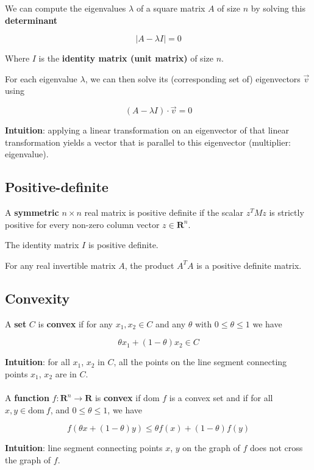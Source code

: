 \documentclass{article}
\begin{document}
We can compute the eigenvalues $\lambda$ of a square matrix $A$ of size $n$ by solving this \textbf{determinant}

$$
|A - \lambda I| = 0
$$

Where $I$ is the \textbf{identity matrix (unit matrix)} of size $n$.

For each eigenvalue $\lambda$, we can then solve its (corresponding set of) eigenvectors $\vec{v}$ using

$$
(A - \lambda I) \cdot \vec{v} = 0
$$

\textbf{Intuition}: applying a linear transformation on an eigenvector of that linear transformation yields a vector that is parallel to this eigenvector (multiplier: eigenvalue).

\subsection{Positive-definite}

A \textbf{symmetric} $n \times n$ real matrix is positive definite if the scalar $z^{T} M z$ is strictly positive for every non-zero column vector $z \in \mathbf{R}^n$.

The identity matrix $I$ is positive definite.

For any real invertible matrix $A$, the product $A^{T} A$ is a positive definite matrix.

\subsection{Convexity}

A \textbf{set} $C$ is \textbf{convex} if for any $x_1, x_2 \in C$ and any $\theta$ with $0 \leq \theta \leq 1$ we have

$$
\theta x_1 + (1 - \theta) x_2 \in C
$$

\textbf{Intuition}: for all $x_1$, $x_2$ in $C$, all the points on the line segment connecting points $x_1$, $x_2$ are in $C$.
\\
\\
A \textbf{function} $f: \mathbf{R}^n \to \mathbf{R}$ is \textbf{convex} if $\text{dom}$ $f$ is a convex set and if for all $x, y \in \text{dom} ~ f$, and $0 \leq \theta \leq 1$, we have

$$
f(\theta x + (1 - \theta) y) \leq \theta f(x) + (1 - \theta) f(y)
$$

\textbf{Intuition}: line segment connecting points $x$, $y$ on the graph of $f$ does not cross the graph of $f$.
\end{document}

